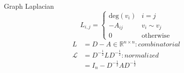 \documentclass{beamer}
\begin{document}
\begin{frame}{Graph Laplacian}
  \[
  L_{i,j} = \begin{cases}\text{deg}(v_i) & i = j\\ -A_{ij} & v_i  \sim v_j \\ 0 &\text{otherwise} \end{cases}
  \]
  \begin{align*}
    L &= D - A \in \mathbb{R}^{n \times n}: combinatorial \\
    \mathcal{L} &= D^{-\frac{1}{2}}LD^{-\frac{1}{2}}: normalized \\
    &= I_n - D^{-\frac{1}{2}}AD^{-\frac{1}{2}}
  \end{align*}
  \scalebox{0.55}{
}
\end{frame}
\end{document}
